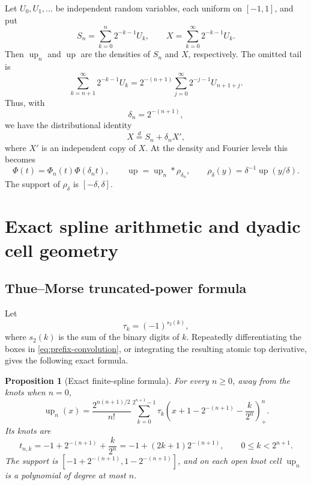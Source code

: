 \documentclass[11pt]{article}
\newtheorem{proposition}[theorem]{Proposition}
\newcommand{\upf}{\operatorname{up}}
\newcommand{\pos}[1]{\left(#1\right)_{+}}
\begin{document}
Let \(U_0,U_1,\ldots\) be independent random variables, each uniform on
\([-1,1]\), and put
\begin{equation}\label{eq:random-sums}
 S_n=\sum_{k=0}^{n}2^{-k-1}U_k,
 \qquad
 X=\sum_{k=0}^{\infty}2^{-k-1}U_k.
\end{equation}
Then \(\upf_n\) and \(\upf\) are the densities of \(S_n\) and \(X\),
respectively.  The omitted tail is
\[
 \sum_{k=n+1}^{\infty}2^{-k-1}U_k
 =2^{-(n+1)}\sum_{j=0}^{\infty}2^{-j-1}U_{n+1+j}.
\]
Thus, with
\begin{equation}\label{eq:delta}
 \delta_n=2^{-(n+1)},
\end{equation}
we have the distributional identity
\begin{equation}\label{eq:head-tail-random}
 X\overset{d}=S_n+\delta_n X',
\end{equation}
where \(X'\) is an independent copy of \(X\).  At the density and Fourier
levels this becomes
\begin{equation}\label{eq:head-tail}
 \Phi(t)=\Phi_n(t)\Phi(\delta_n t),
 \qquad
 \upf=\upf_n*\rho_{\delta_n},
 \qquad
 \rho_\delta(y)=\delta^{-1}\upf(y/\delta).
\end{equation}
The support of \(\rho_\delta\) is \([-\delta,\delta]\).

\section{Exact spline arithmetic and dyadic cell geometry}

\subsection{Thue--Morse truncated-power formula}

Let
\[
 \tau_k=(-1)^{s_2(k)},
\]
where \(s_2(k)\) is the sum of the binary digits of \(k\).  Repeatedly
differentiating the boxes in \cref{eq:prefix-convolution}, or integrating the
resulting atomic top derivative, gives the following exact formula.

\begin{proposition}[Exact finite-spline formula]\label{prop:truncated-power}
For every \(n\ge0\), away from the knots when \(n=0\),
\begin{equation}\label{eq:truncated-power}
 \boxed{\displaystyle
 \upf_n(x)=\frac{2^{n(n+1)/2}}{n!}
 \sum_{k=0}^{2^{n+1}-1}\tau_k
 \pos{x+1-2^{-(n+1)}-\frac{k}{2^n}}^{n}.}
\end{equation}
Its knots are
\begin{equation}\label{eq:knots}
 t_{n,k}=-1+2^{-(n+1)}+\frac{k}{2^n}
        =-1+(2k+1)2^{-(n+1)},
 \qquad 0\le k<2^{n+1}.
\end{equation}
The support is \([-1+2^{-(n+1)},1-2^{-(n+1)}]\), and on each open knot cell
\(\upf_n\) is a polynomial of degree at most \(n\).
\end{proposition}
\end{document}
